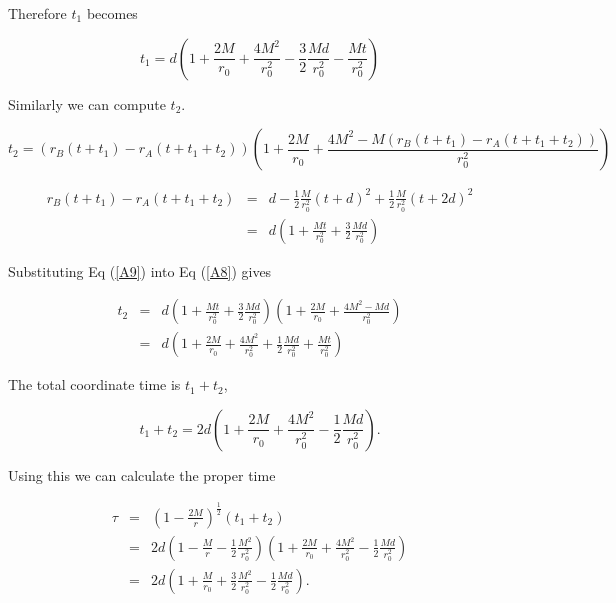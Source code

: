 \documentclass[aps,showpacs,onecolumn,floats,prd,superscriptaddress,nofootinbib]{revtex4-1}
\begin{document}
%
%
%

Therefore $t_1$ becomes

\begin{equation}
	t_1 = d \left( 1 + \frac{2M}{r_0} + \frac{4M^2}{r_0^2} - \frac{3}{2} \frac{Md}{r_0^2} - \frac{Mt}{r_0^2} \right)
\end{equation}

Similarly we can compute $t_2$.

\begin{equation}
	t_2 = (r_B(t + t_1) - r_A(t+t_1 +t_2)) \left( 1 + \frac{2M}{r_0} + \frac{4M^2 - M (r_B(t + t_1) - r_A(t+t_1+t_2))}{r_0^2} \right)	\label{A8}
\end{equation}

\begin{eqnarray}
	r_B(t + t_1) - r_A(t + t_1 + t_2) & = & d - \frac{1}{2} \frac{M}{r_0^2} (t + d)^2 + \frac{1}{2} \frac{M}{r_0^2} (t + 2d)^2	\nonumber	\\
	& = & d \left( 1 + \frac{Mt}{r_0^2} + \frac{3}{2} \frac{Md}{r_0^2} \right) 	\label{A9}
\end{eqnarray}

Substituting Eq (\ref{A9}) into Eq (\ref{A8}) gives 

\begin{eqnarray}
	t_2 & = & d \left( 1 + \frac{Mt}{r_0^2} + \frac{3}{2} \frac{Md}{r_0^2} \right) \left( 1 + \frac{2M}{r_0} + \frac{4M^2 - Md}{r_0^2} \right)\nonumber	\\
	& = & d \left( 1 + \frac{2M}{r_0} + \frac{4M^2}{r_0^2} + \frac{1}{2} \frac{Md}{r_0^2} + \frac{Mt}{r_0^2} \right)
\end{eqnarray}

The total coordinate time is $t_1 + t_2$,

\begin{equation}
	t_1 +t_2 = 2d \left(1 + \frac{2M}{r_0} + \frac{4M^2}{r_0^2} - \frac{1}{2} \frac{Md}{r_0^2}\right).
\end{equation}

Using this we can calculate the proper time

\begin{eqnarray}
	\tau & = &  \left( 1 - \frac{2M}{r} \right)^\frac{1}{2} (t_1 + t_2) 	\nonumber	\\
	& = & 2d \left( 1 - \frac{M}{r} - \frac{1}{2} \frac{M^2}{r_0^2} \right) \left( 1 + \frac{2M}{r_0} + \frac{4M^2}{r_0^2} - \frac{1}{2} \frac{Md}{r_0^2} \right)		\nonumber	\\
	&  = & 2d \left( 1  + \frac{M}{r_0} + \frac{3}{2} \frac{M^2}{r_0^2} - \frac{1}{2} \frac{Md}{r_0^2} \right).	\label{tauini}
\end{eqnarray}
\end{document}
